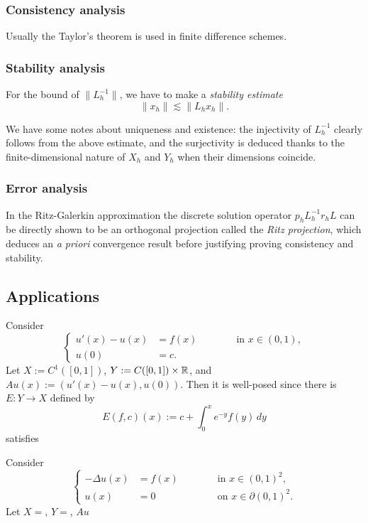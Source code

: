 \documentclass[a4paper]{article}
\begin{document}
\subsubsection*{Consistency analysis}
Usually the Taylor's theorem is used in finite difference schemes.


\subsubsection*{Stability analysis}
For the bound of $\|L_h^{-1}\|$, we have to make a \emph{stability estimate}
\[\|x_h\|\lesssim\|L_hx_h\|.\]

We have some notes about uniqueness and existence: the injectivity of $L_h^{-1}$ clearly follows from the above estimate, and the surjectivity is deduced thanks to the finite-dimensional nature of $X_h$ and $Y_h$ when their dimensions coincide.

\subsubsection*{Error analysis}
In the Ritz-Galerkin approximation the discrete solution operator $p_hL_h^{-1}r_hL$ can be directly shown to be an orthogonal projection called the \emph{Ritz projection}, which deduces an \emph{a priori} convergence result before justifying proving consistency and stability.




\subsection{Applications}
\begin{ex}
Consider
\[\left\{\begin{alignedat}{2}
u'(x)-u(x)&=f(x) &\qquad&\text{ in }x\in(0,1),\\
u(0)&=c. &&
\end{alignedat}\right.\]
Let $X:=C^1([0,1])$, $Y:=C([0,1])\times\mathbb{R}$, and $Au(x):=(u'(x)-u(x),u(0))$.
Then it is well-posed since there is $E:Y\to X$ defined by
\[E(f,c)(x):=c+\int_0^xe^{-y}f(y)\,dy\]
satisfies
\end{ex}

\begin{ex}
Consider
\[\left\{\begin{alignedat}{2}
-\Delta u(x)&=f(x) &\qquad&\text{ in }x\in(0,1)^2,\\
u(x)&=0 &&\text{ on }x\in\partial(0,1)^2.
\end{alignedat}\right.\]
Let $X=$, $Y=$, $Au$
\end{ex}
\end{document}
